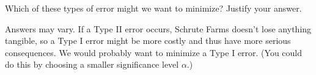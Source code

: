 \documentclass[noanswers]{exam}
\begin{document}
\begin{questions}
\question Which of these types of error might we want to minimize? Justify your answer. 

\begin{solution}[\stretch{1}]

\vspace{1mm}

Answers may vary. If a Type II error occurs, Schrute Farms doesn't lose anything tangible, so a Type I error might be more costly and thus have more serious consequences. We would probably want to minimize a Type I error. (You could do this by choosing a smaller significance level $\alpha$.)

\vspace{1mm}

\end{solution}


\end{questions}
\end{document}
